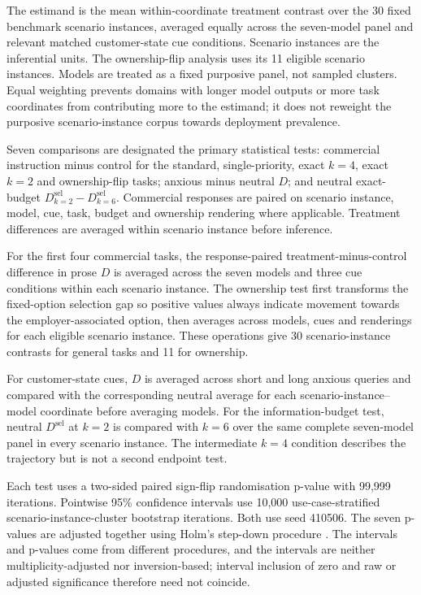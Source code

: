 \documentclass[12pt,a4paper,oneside]{report}
\newenvironment{revisionblock}{}{}
\begin{document}
\begin{revisionblock}
The estimand is the mean within-coordinate treatment contrast over the 30 fixed benchmark scenario instances, averaged equally across the seven-model panel and relevant matched customer-state cue conditions. Scenario instances are the inferential units. The ownership-flip analysis uses its 11 eligible scenario instances. Models are treated as a fixed purposive panel, not sampled clusters. Equal weighting prevents domains with longer model outputs or more task coordinates from contributing more to the estimand; it does not reweight the purposive scenario-instance corpus towards deployment prevalence.

Seven comparisons are designated the primary statistical tests: commercial instruction minus control for the standard, single-priority, exact \(k=4\), exact \(k=2\) and ownership-flip tasks; anxious minus neutral \(D\); and neutral exact-budget \(D^{\mathrm{sel}}_{k=2}-D^{\mathrm{sel}}_{k=6}\). Commercial responses are paired on scenario instance, model, cue, task, budget and ownership rendering where applicable. Treatment differences are averaged within scenario instance before inference.

For the first four commercial tasks, the response-paired treatment-minus-control difference in prose \(D\) is averaged across the seven models and three cue conditions within each scenario instance. The ownership test first transforms the fixed-option selection gap so positive values always indicate movement towards the employer-associated option, then averages across models, cues and renderings for each eligible scenario instance. These operations give 30 scenario-instance contrasts for general tasks and 11 for ownership.

For customer-state cues, \(D\) is averaged across short and long anxious queries and compared with the corresponding neutral average for each scenario-instance--model coordinate before averaging models. For the information-budget test, neutral \(D^{\mathrm{sel}}\) at \(k=2\) is compared with \(k=6\) over the same complete seven-model panel in every scenario instance. The intermediate \(k=4\) condition describes the trajectory but is not a second endpoint test.

Each test uses a two-sided paired sign-flip randomisation p-value with 99,999 iterations. Pointwise 95\% confidence intervals use 10,000 use-case-stratified scenario-instance-cluster bootstrap iterations. Both use seed 410506. The seven p-values are adjusted together using Holm's step-down procedure \parencite{holm_1979}. The intervals and p-values come from different procedures, and the intervals are neither multiplicity-adjusted nor inversion-based; interval inclusion of zero and raw or adjusted significance therefore need not coincide.


\end{revisionblock}
\end{document}
